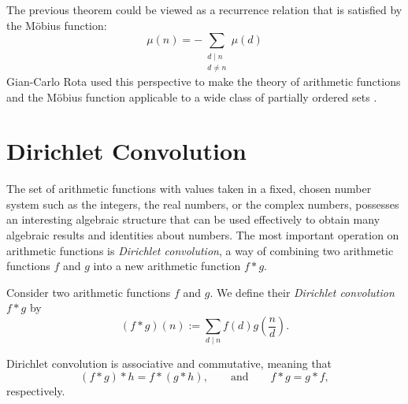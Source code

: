 \begin{remark}
  The previous theorem could be viewed as a recurrence relation that is satisfied by the M\"obius function:
  \begin{equation*}
    \mu(n)=-\sum_{\substack{d\mid n\\d\neq n}}\mu(d)
  \end{equation*}
  Gian-Carlo Rota used this perspective to make the theory of arithmetic functions and the M\"obius function applicable to a wide class of partially ordered sets \cite{rota1964}.
\end{remark}

\section{Dirichlet Convolution}

The set of arithmetic functions with values taken in a fixed, chosen number system such as the integers, the real numbers, or the complex numbers, possesses an interesting algebraic structure that can be used effectively to obtain many algebraic results and identities about numbers. The most important operation on arithmetic functions is \emph{Dirichlet convolution}, a way of combining two arithmetic functions $f$ and $g$ into a new arithmetic function $f\ast g$.

\begin{definition}
  Consider two arithmetic functions $f$ and $g$. We define their \emph{Dirichlet convolution} $f\ast g$ by
  \begin{equation*}
    (f\ast g)(n) := \sum_{d\mid n}f(d)g\left(\frac{n}{d}\right).
  \end{equation*}
\end{definition}

\begin{theorem}
  Dirichlet convolution is associative and commutative, meaning that
  \begin{equation*}
    (f\ast g)\ast h=f\ast(g\ast h),\qquad\text{and}\qquad f\ast g=g\ast f,
  \end{equation*}
  respectively.
\end{theorem}

